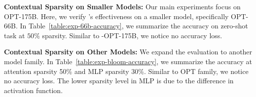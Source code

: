 \textbf{Contextual Sparsity on Smaller Models:} Our main experiments focus on OPT-175B. Here, we verify \name{}'s effectiveness on a smaller model, specifically OPT-66B. In Table~\ref{table:exp-66b-accuracy}, we summarize the accuracy on zero-shot task at $50\%$ 
sparsity. Similar to \name{}-OPT-175B, we notice no accuracy loss.

\textbf{Contextual Sparsity on Other Models:} We expand the evaluation to another model family. In Table~\ref{table:exp-bloom-accuracy}, we summarize the accuracy at attention sparsity 50\% and MLP sparsity 30\%. Similar to OPT family, we notice no accuracy loss. The lower sparsity level in MLP is due to the difference in activation function.



\begin{table}[t]
\vspace{-4mm}
\scriptsize
\centering
\caption{\name{}-OPT66B on zero-shot downstream task.}
\vspace{2mm}
\vspace{-3mm}
\label{table:exp-66b-accuracy}
\end{table}




\iffalse

